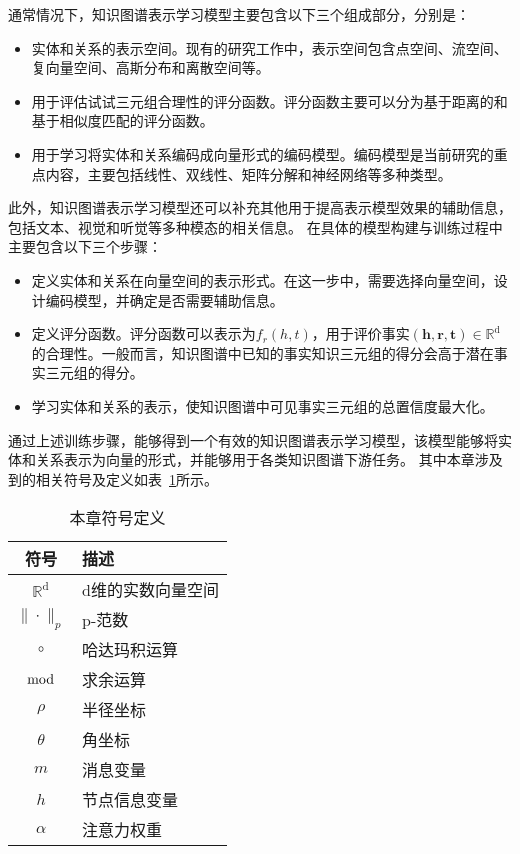 \documentclass[algorithmlist, AutoFakeBold, AutoFakeSlant, figurelist, tablelist, nomlist, masters]{seuthesix}
\begin{document}
通常情况下，知识图谱表示学习模型主要包含以下三个组成部分，分别是：
\begin{itemize}
  \item [1.] 实体和关系的表示空间。现有的研究工作中，表示空间包含点空间、流空间、复向量空间、高斯分布和离散空间等。
  \item [2.] 用于评估试试三元组合理性的评分函数。评分函数主要可以分为基于距离的和基于相似度匹配的评分函数。
  \item [3.] 用于学习将实体和关系编码成向量形式的编码模型。编码模型是当前研究的重点内容，主要包括线性、双线性、矩阵分解和神经网络等多种类型。
\end{itemize}

此外，知识图谱表示学习模型还可以补充其他用于提高表示模型效果的辅助信息，包括文本、视觉和听觉等多种模态的相关信息。
在具体的模型构建与训练过程中主要包含以下三个步骤：
\begin{itemize}
  \item [1.] 定义实体和关系在向量空间的表示形式。在这一步中，需要选择向量空间，设计编码模型，并确定是否需要辅助信息。
  \item [2.] 定义评分函数。评分函数可以表示为$f_r(h, t)$，用于评价事实$\left(\bm{h}, \bm{r}, \bm{t}\right) \in \mathbb{R}^{\mathrm{d}}$的合理性。一般而言，知识图谱中已知的事实知识三元组的得分会高于潜在事实三元组的得分。
  \item [3.] 学习实体和关系的表示，使知识图谱中可见事实三元组的总置信度最大化。
\end{itemize}

通过上述训练步骤，能够得到一个有效的知识图谱表示学习模型，该模型能够将实体和关系表示为向量的形式，并能够用于各类知识图谱下游任务。
其中本章涉及到的相关符号及定义如表~\ref{2_symbols}所示。
\begin{table}
  \centering
  \begin{tabular*}{0.4\textwidth}{@{\extracolsep{\fill}}cl}
		\toprule[1pt]
    符号 & 描述 \\ \hline
    $\mathbb{R}^{\mathrm{d}}$ & d维的实数向量空间\\
    $\|\cdot\|_{p}$ & p-范数\\
    $\circ$ & 哈达玛积运算\\
    $\bmod$ & 求余运算\\
    $\rho$ & 半径坐标\\
    $\theta$ & 角坐标\\
    $m$ & 消息变量\\
    $h$ & 节点信息变量\\
    $\alpha$ & 注意力权重\\
		\bottomrule[1pt]
	\end{tabular*}
  \caption{本章符号定义}
  \label{2_symbols}
\end{table}
\end{document}
